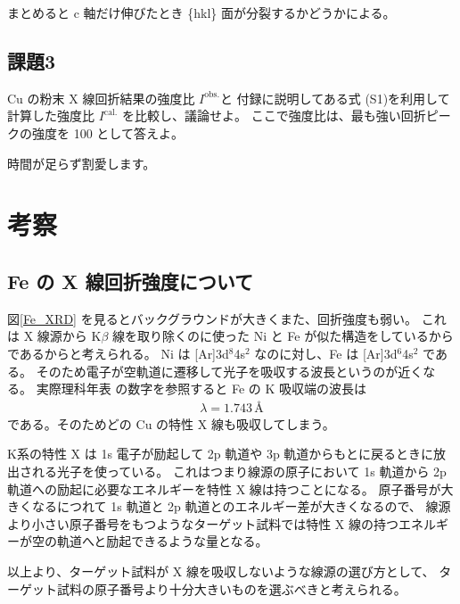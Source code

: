 \documentclass[11pt,dvipdfmx,a4paper]{jsarticle}
\begin{document}
まとめると c 軸だけ伸びたとき \{hkl\} 面が分裂するかどうかによる。

\subsection*{課題3}
Cu の粉末 X 線回折結果の強度比 \(I^{\text{obs.}}\)と
付録に説明してある式 (S1)を利用して計算した強度比 \(I^{\text{cal.}}\)
を比較し、議論せよ。
ここで強度比は、最も強い回折ピークの強度を 100 として答えよ。

時間が足らず割愛します。

\section{考察}
\subsection{Fe の X 線回折強度について}
図\ref{Fe_XRD} を見るとバックグラウンドが大きくまた、回折強度も弱い。
これは X 線源から K\(\beta\) 線を取り除くのに使った Ni と Fe が似た構造をしているからであるからと考えられる。
Ni は [Ar]3d\(^8\)4s\(^2\) なのに対し、Fe は [Ar]3d\(^6\)4s\(^2\) である。
そのため電子が空軌道に遷移して光子を吸収する波長というのが近くなる。
実際理科年表\cite{rikanenpyo} の数字を参照すると Fe の K 吸収端の波長は
\begin{align}
	\lambda = 1.743 \,\text{\AA}
\end{align}
である。そのためどの Cu の特性 X 線も吸収してしまう。

K系の特性 X は 1s 電子が励起して 2p 軌道や 3p 軌道からもとに戻るときに放出される光子を使っている。
これはつまり線源の原子において 1s 軌道から 2p 軌道への励起に必要なエネルギーを特性 X 線は持つことになる。
原子番号が大きくなるにつれて 1s 軌道と 2p 軌道とのエネルギー差が大きくなるので、
線源より小さい原子番号をもつようなターゲット試料では特性 X 線の持つエネルギーが空の軌道へと励起できるような量となる。

以上より、ターゲット試料が X 線を吸収しないような線源の選び方として、
ターゲット試料の原子番号より十分大きいものを選ぶべきと考えられる。
\end{document}
